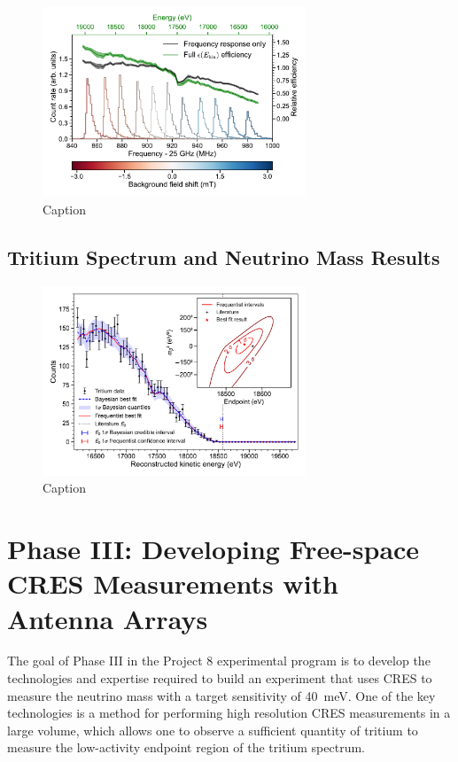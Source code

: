 \begin{figure}[htbp]
    \centering
    \includegraphics[width=0.7\textwidth]{figs/Chapter-3/fss_for_prl_plot.pdf}
    \caption{Caption}
    \label{fig:fss_plot}
\end{figure}

\subsection{Tritium Spectrum and Neutrino Mass Results}

\begin{figure}
    \centering
    \includegraphics[width=0.7\textwidth]{figs/Chapter-3/12-03-22A_final_E0_real_data_phase_II_tritium_fit_1d.pdf}
    \caption{Caption}
    \label{fig:final_tritium_fit}
\end{figure}

\section{Phase III: Developing Free-space CRES Measurements with Antenna Arrays}

The goal of Phase III in the Project 8 experimental program is to develop the technologies and expertise required to build an experiment that uses CRES to measure the neutrino mass with a target sensitivity of 40~meV. One of the key technologies is a method for performing high resolution CRES measurements in a large volume, which allows one to observe a sufficient quantity of tritium to measure the low-activity endpoint region of the tritium spectrum. 

